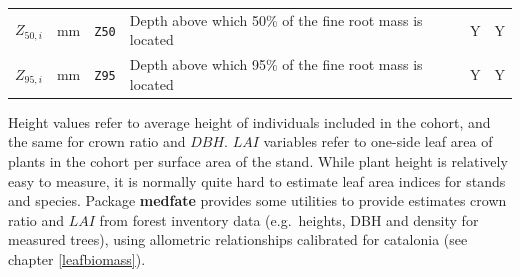 \documentclass[]{book}
\begin{document}
\begin{longtable}[]{@{}llllll@{}}
\begin{minipage}[t]{0.10\columnwidth}
\(Z_{50,i}\)\strut
\end{minipage} & \begin{minipage}[t]{0.09\columnwidth}\raggedright\strut
mm\strut
\end{minipage} & \begin{minipage}[t]{0.06\columnwidth}\raggedright\strut
\texttt{Z50}\strut
\end{minipage} & \begin{minipage}[t]{0.43\columnwidth}\raggedright\strut
Depth above which 50\% of the fine root mass is located\strut
\end{minipage} & \begin{minipage}[t]{0.07\columnwidth}\raggedright\strut
Y\strut
\end{minipage} & \begin{minipage}[t]{0.07\columnwidth}\raggedright\strut
Y\strut
\end{minipage}\tabularnewline
\begin{minipage}[t]{0.10\columnwidth}\raggedright\strut
\(Z_{95,i}\)\strut
\end{minipage} & \begin{minipage}[t]{0.09\columnwidth}\raggedright\strut
mm\strut
\end{minipage} & \begin{minipage}[t]{0.06\columnwidth}\raggedright\strut
\texttt{Z95}\strut
\end{minipage} & \begin{minipage}[t]{0.43\columnwidth}\raggedright\strut
Depth above which 95\% of the fine root mass is located\strut
\end{minipage} & \begin{minipage}[t]{0.07\columnwidth}\raggedright\strut
Y\strut
\end{minipage} & \begin{minipage}[t]{0.07\columnwidth}\raggedright\strut
Y\strut
\end{minipage}\tabularnewline
\bottomrule
\end{longtable}

Height values refer to average height of individuals included in the
cohort, and the same for crown ratio and \(DBH\). \(LAI\) variables
refer to one-side leaf area of plants in the cohort per surface area of
the stand. While plant height is relatively easy to measure, it is
normally quite hard to estimate leaf area indices for stands and
species. Package \textbf{medfate} provides some utilities to provide
estimates crown ratio and \(LAI\) from forest inventory data
(e.g.~heights, DBH and density for measured trees), using allometric
relationships calibrated for catalonia (see chapter \ref{leafbiomass}).
\end{document}
